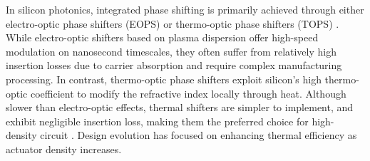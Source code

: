In silicon photonics, integrated phase shifting is primarily achieved through either electro-optic phase shifters (EOPS) or thermo-optic phase shifters (TOPS) \cite{eo_ps, liu2022thermo}.
While electro-optic shifters based on plasma dispersion offer high-speed modulation on nanosecond timescales, they often suffer from relatively high insertion losses due to carrier absorption and require complex manufacturing processing.
In contrast, thermo-optic phase shifters exploit silicon's high thermo-optic coefficient to modify the refractive index locally through heat.
Although slower than electro-optic effects, thermal shifters are simpler to implement, and exhibit negligible insertion loss, making them the preferred choice for high-density circuit \cite{liu2022thermo}.
Design evolution has focused on enhancing thermal efficiency as actuator density increases.


